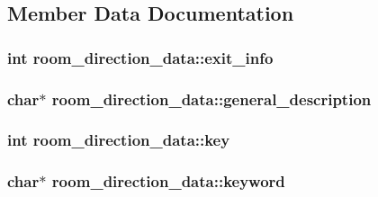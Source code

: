 \subsection{Member Data Documentation}
\hypertarget{structroom__direction__data_ad4e0b315a7b257e243a46493c820e690}{
\subsubsection[{exit\-\_\-info}]{\setlength{\rightskip}{0pt plus 5cm}int room\-\_\-direction\-\_\-data\-::exit\-\_\-info}}\label{structroom__direction__data_ad4e0b315a7b257e243a46493c820e690}
\hypertarget{structroom__direction__data_a1ade427d564a7a8f6777187eabd8bb33}{
\subsubsection[{general\-\_\-description}]{\setlength{\rightskip}{0pt plus 5cm}char$\ast$ room\-\_\-direction\-\_\-data\-::general\-\_\-description}}\label{structroom__direction__data_a1ade427d564a7a8f6777187eabd8bb33}
\hypertarget{structroom__direction__data_a7dbbe646bb08df5182a5c0e9f0d9f96a}{
\subsubsection[{key}]{\setlength{\rightskip}{0pt plus 5cm}int room\-\_\-direction\-\_\-data\-::key}}\label{structroom__direction__data_a7dbbe646bb08df5182a5c0e9f0d9f96a}
\hypertarget{structroom__direction__data_a474e18e08063ab1ceee6515055dd1bc6}{
\subsubsection[{keyword}]{\setlength{\rightskip}{0pt plus 5cm}char$\ast$ room\-\_\-direction\-\_\-data\-::keyword}}\label{structroom__direction__data_a474e18e08063ab1ceee6515055dd1bc6}
